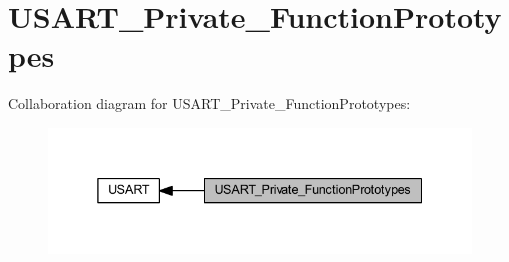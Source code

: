 \hypertarget{group___u_s_a_r_t___private___function_prototypes}{}\section{U\+S\+A\+R\+T\+\_\+\+Private\+\_\+\+Function\+Prototypes}
\label{group___u_s_a_r_t___private___function_prototypes}
Collaboration diagram for U\+S\+A\+R\+T\+\_\+\+Private\+\_\+\+Function\+Prototypes\+:
\nopagebreak
\begin{figure}[H]
\begin{center}
\leavevmode
\includegraphics[width=338pt]{group___u_s_a_r_t___private___function_prototypes}
\end{center}
\end{figure}
